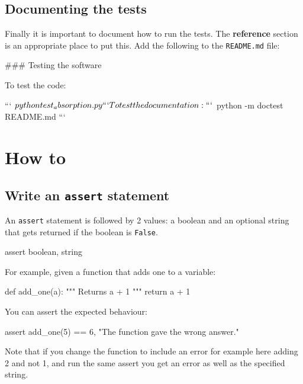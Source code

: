 \subsection{Documenting the tests}
\label{\detokenize{building-tools/07-testing/tutorial/main:documenting-the-tests}}

Finally it is important to document how to run the tests. The \textbf{reference}
section is an appropriate place to put this. Add the following to the
\texttt{README.md} file:

\begin{md}
### Testing the software

To test the code:

```
$ python test_absorption.py
```

To test the documentation:

```
$ python -m doctest README.md
```
\end{md}

\section{How to}

\subsection{Write an \texttt{assert} statement}
\label{\detokenize{building-tools/07-testing/how/main:how-to-write-an-assert-statement}}

An \texttt{assert} statement is followed by 2 values: a boolean and an optional
string that gets returned if the boolean is \texttt{False}.


\begin{api}
assert boolean, string
\end{api}



For example, given a function that adds one to a variable:




\begin{pyin}
def add_one(a):
    """
    Returns a + 1
    """
    return a + 1
\end{pyin}

You can assert the expected behaviour:

\begin{pyin}
assert add_one(5) == 6, "The function gave the wrong answer."
\end{pyin}

Note that if you change the function to include an error for example here adding
2 and not 1, and run the same assert
you get an error as well as the specified string.

